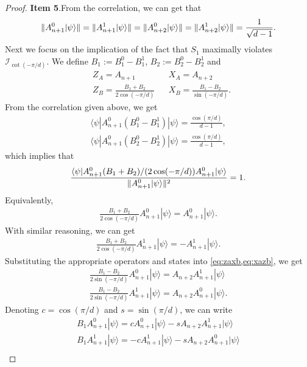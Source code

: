 \documentclass[11pt,letterpaper]{article}
\newcommand{\ket}[1]{|#1\rangle}
\newcommand{\bra}[1]{\langle#1|}
\DeclarePairedDelimiter{\norm}{\lVert}{\rVert}
\newcommand{\1}{\mathbb{1}}
\newcommand{\I}{\mathcal{I}}
\theoremstyle{definition}
\begin{document}
\begin{proof}
	\textbf{Item 5}.From the correlation, we can get that 
	\begin{align}
	\norm{A_{n+1}^0 \ket{\psi}} = \norm{A_{n+1}^1 \ket{\psi}} =\norm{A_{n+2}^0 \ket{\psi}} = \norm{A_{n+2}^1 \ket{\psi}} = \frac{1}{\sqrt{d-1}}.
	\end{align}
	Next we focus on the implication of the fact that $S_1$ maximally violates $\I_{\cot(-\pi/d)}$.
	We define $B_1 := B_1^0 - B_1^1$, $B_2 := B_2^0-B_2^1$ and
	\begin{align}
		&Z_A  = A_{n+1} && X_A = A_{n+2} \\
		&Z_B = \frac{B_1+B_2}{2\cos(-\pi/d)} && X_B = \frac{B_1-B_2}{\sin(-\pi/d)}.
	\end{align}
	From the correlation given above, we get 
         \begin{align}
         	\bra{\psi} A_{n+1}^0 (B_1^0 - B_1^1) \ket{\psi} = \frac{\cos(\pi/d)}{d-1},\\
        		\bra{\psi} A_{n+1}^0 (B_2^0 - B_2^1) \ket{\psi} = \frac{\cos(\pi/d)}{d-1},
         \end{align}
        which implies that 
        \begin{align}
        		\frac{\bra{\psi} A_{n+1}^0 (B_1 + B_2)/(2\cos(-\pi/d)) A_{n+1}^0 \ket{\psi}}{\norm{A_{n+1}^0 \ket{\psi}}^2} = 1.
        \end{align}
        Equivalently,
        \begin{align}
        		\frac{B_1+B_2}{2 \cos(-\pi/d)} A_{n+1}^0 \ket{\psi} = A_{n+1}^0 \ket{\psi}.
        \end{align}
        With similar reasoning, we can get
        \begin{align}
        		\frac{B_1+B_2}{2 \cos(-\pi/d)} A_{n+1}^1 \ket{\psi} = -A_{n+1}^1 \ket{\psi}.
        \end{align}
	Substituting the appropriate operators and states into \cref{eq:zaxb,eq:xazb}, we get
	\begin{align}
		\frac{B_1-B_2}{2 \sin(-\pi/d)} A_{n+1}^0\ket{\psi} =A_{n+2} A_{n+1}^1\ket{\psi}\\
		\frac{B_1 -B_2}{2\sin(-\pi/d)} A_{n+1}^1 \ket{\psi} = A_{n+2} A_{n+1}^0 \ket{\psi}.
	\end{align}
	Denoting $c = \cos(\pi/d)$ and $s = \sin(\pi/d)$, we can write 
        \begin{align}
        		B_1A_{n+1}^0 \ket{\psi} = cA_{n+1}^0\ket{\psi} - sA_{n+2}A_{n+1}^1\ket{\psi}\\
        		B_1A_{n+1}^1 \ket{\psi} = -cA_{n+1}^1\ket{\psi} - sA_{n+2}A_{n+1}^0\ket{\psi}\\

\end{align}
\end{proof}
\end{document}

